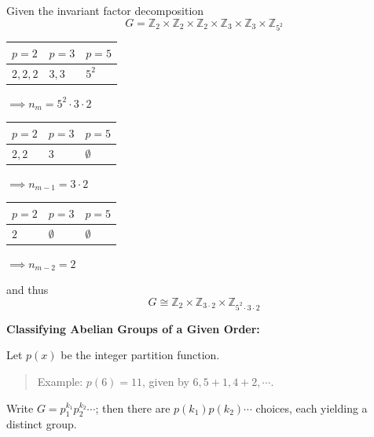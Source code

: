Given the invariant factor decomposition \[
G = {{\mathbb{Z}}_{2}\times{\mathbb{Z}}_{2}\times{\mathbb{Z}}_{2}\times{\mathbb{Z}}_{3}\times{\mathbb{Z}}_{3}\times{\mathbb{Z}}_{5^2}}
\]

\begin{longtable}[]{@{}lll@{}}
\toprule
\(p = 2\) & \(p= 3\) & \(p =5\)\tabularnewline
\midrule
\endhead
\(2,2,2\) & \(3,3\) & \(5^2\)\tabularnewline
\bottomrule
\end{longtable}

\(\implies n_m = 5^2 \cdot 3 \cdot 2\)

\begin{longtable}[]{@{}lll@{}}
\toprule
\(p = 2\) & \(p= 3\) & \(p =5\)\tabularnewline
\midrule
\endhead
\(2,2\) & \(3\) & \(\emptyset\)\tabularnewline
\bottomrule
\end{longtable}

\(\implies n_{m-1} = 3 \cdot 2\)

\begin{longtable}[]{@{}lll@{}}
\toprule
\(p = 2\) & \(p= 3\) & \(p =5\)\tabularnewline
\midrule
\endhead
\(2\) & \(\emptyset\) & \(\emptyset\)\tabularnewline
\bottomrule
\end{longtable}

\(\implies n_{m-2} = 2\)

and thus \[
G\cong {\mathbb{Z}}_2 \times {\mathbb{Z}}_{3\cdot 2} \times {\mathbb{Z}}_{5^2 \cdot 3 \cdot 2}
\]

\textbf{Classifying Abelian Groups of a Given Order:}

Let \(p(x)\) be the integer partition function.

\begin{quote}
Example: \(p(6) = 11\), given by \(6, 5+1, 4+2, \cdots\).
\end{quote}

Write \(G = p_1^{k_1} p_2^{k_2} \cdots\); then there are
\(p(k_1) p(k_2) \cdots\) choices, each yielding a distinct group.





